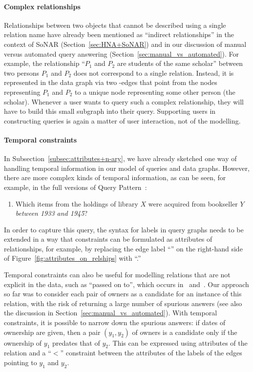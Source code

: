 \paragraph{Complex relationships}

Relationships between two objects that cannot be described using a single relation name
have already been mentioned as \enquote{indirect relationships}
in the context of SoNAR (Section~\ref{sec:HNA+SoNAR})
and in our discussion of manual versus automated query answering (Section~\ref{sec:manual_vs_automated}).
For example, the relationship \enquote{$P_1$ and $P_2$ are students of the same scholar}
between two persons $P_1$ and $P_2$ does not correspond to a single relation.
Instead, it is represented in the data graph 
via two -edges that point from the nodes representing $P_1$ and $P_2$
to a unique node representing some other person (the scholar).
Whenever a user wants to query such a complex relationship, they will
have to build this small subgraph into their query.
Supporting users in constructing queries is again a matter of user interaction,
not of the modelling.

\paragraph{Temporal constraints}

In Subsection~\ref{subsec:attributes+n-ary}, we have already sketched one way of handling
temporal information in our model of queries and data graphs.
However, there are more complex kinds of temporal information,
as can be seen, for example, in the full versions of Query Pattern~:
%
\begin{enumerate}
  \item[\exaquery{5}]
    Which items from the holdings of library $X$ were acquired from bookseller $Y$
    \emph{between 1933 and 1945}?
\end{enumerate}
%
In order to capture this query, the syntax for labels in query graphs needs to be extended in a way that
constraints can be formulated as attributes of relationships,
for example, 
by replacing the edge label \enquote{}
on the right-hand side of Figure~\ref{fig:attributes_on_relships}
with \enquote{.}

Temporal constraints can also be useful for modelling relations
that are not explicit in the data, such as \enquote{passed on to}, which occurs in~ and~.
Our approach so far was to consider each pair of owners as a candidate for an instance of this relation,
with the risk of returning a large number of spurious answers
(see also the discussion in Section~\ref{sec:manual_vs_automated}).
With temporal constraints, it is possible to narrow down the spurious answers:
if dates of ownership are given, then a pair $(y_1,y_2)$ of owners
is a candidate only if the ownership of $y_1$ predates that of $y_2$.
This can be expressed using attributes of the  relation
and a \enquote{$<$} constraint between the attributes of the  labels
of the edges pointing to $y_1$ and $y_2$.

